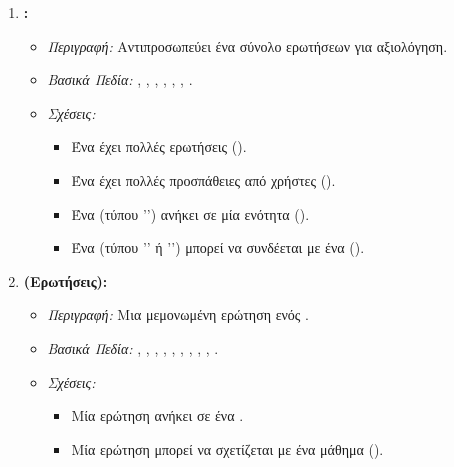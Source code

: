 \begin{enumerate}[leftmargin=*, label=\arabic*., wide, labelwidth=!, labelindent=0pt, itemsep=1ex]
    \item \textbf{\texttt{}:}
        \begin{itemize}[leftmargin=1.5em, noitemsep]
            \item \textit{Περιγραφή:} Αντιπροσωπεύει ένα σύνολο ερωτήσεων για αξιολόγηση.
            \item \textit{Βασικά Πεδία:} \texttt{}, \texttt{}, \texttt{}, \texttt{}, \texttt{}, \texttt{}, \texttt{}.
            \item \textit{Σχέσεις:}
            \begin{itemize}[leftmargin=1.5em, noitemsep]
                \item Ένα  έχει πολλές ερωτήσεις ().
                \item Ένα  έχει πολλές προσπάθειες από χρήστες ().
                \item Ένα  (τύπου '') ανήκει σε μία ενότητα ().
                \item Ένα  (τύπου '' ή '') μπορεί να συνδέεται με ένα  ().
            \end{itemize}
        \end{itemize}

    \item \textbf{\texttt{} (Ερωτήσεις):}
        \begin{itemize}[leftmargin=1.5em, noitemsep]
            \item \textit{Περιγραφή:} Μια μεμονωμένη ερώτηση ενός .
            \item \textit{Βασικά Πεδία:} \texttt{}, \texttt{}, \texttt{}, \texttt{}, \texttt{}, \texttt{}, \texttt{}, \texttt{}, \texttt{}, \texttt{}.
            \item \textit{Σχέσεις:}
            \begin{itemize}[leftmargin=1.5em, noitemsep]
                \item Μία ερώτηση ανήκει σε ένα .
                \item Μία ερώτηση μπορεί να σχετίζεται με ένα μάθημα ().
            \end{itemize}
        \end{itemize}


\end{enumerate}
